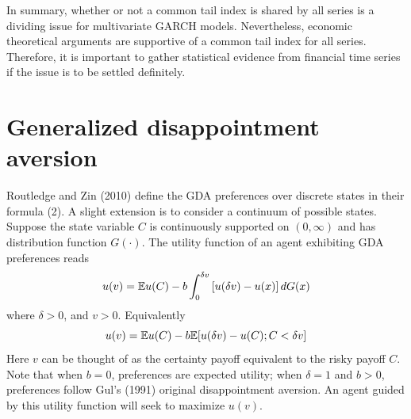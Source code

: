 \documentclass{article}
\begin{document}
In summary, whether or not a common tail index is shared by all
series is a dividing issue for multivariate GARCH
models. Nevertheless, economic theoretical arguments are supportive of
a common tail index for all series. Therefore, it is important to
gather statistical evidence from financial time series if the issue is
to be settled definitely.

\section{Generalized disappointment aversion}
\label{sec:GDA}
Routledge and Zin (2010) \cite{routledge2010generalized} define the GDA
preferences over discrete states in their formula (2). A slight extension
is to consider a continuum of possible states. Suppose the state variable
$C$ is continuously supported on $(0, \infty)$ and has distribution
function $G(\cdot)$. The utility function of an agent exhibiting GDA
preferences reads
\begin{equation}
  u(v)= \E u(C) - b \int_{0}^{\delta v}
  \left[ u(\delta v) - u(x) \right] dG(x)\label{11}%
\end{equation}
where $\delta > 0$, and $v>0$. Equivalently
\begin{equation}
  \label{eq:xxie0}
  u(v) = \mathbb{E} u(C) - b \mathbb{E}[u(\delta v) - u(C); C < \delta v]
\end{equation}
Here $v$ can be thought of as the certainty payoff equivalent to the
risky payoff $C$. Note that when $b=0$, 
preferences are expected utility; when $\delta=1$ and $b>0$,
preferences follow Gul's (1991) original disappointment aversion.
An agent guided by this utility function will seek to maximize $u(v)$.
\end{document}
